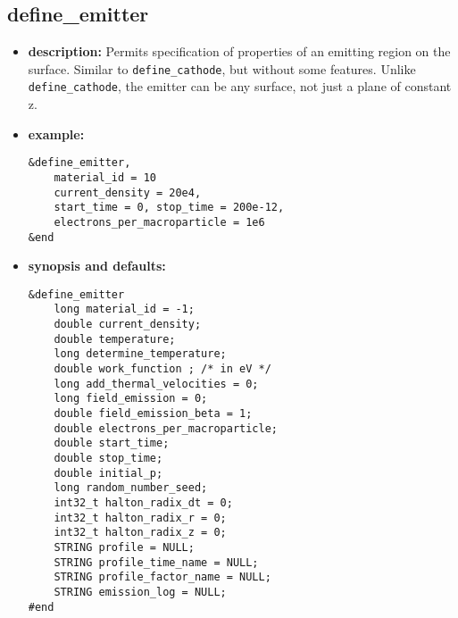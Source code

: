 %
\newpage

\subsection{define\_emitter}

\begin{itemize}

\item {\bf description:}
Permits specification of properties of an emitting region on the surface.
Similar to \verb|define_cathode|, but without some features.
Unlike \verb|define_cathode|, the emitter can be any surface, not just a plane of
constant z.

\item {\bf example:} 
\begin{verbatim}
&define_emitter,
    material_id = 10
    current_density = 20e4, 
    start_time = 0, stop_time = 200e-12,
    electrons_per_macroparticle = 1e6
&end
\end{verbatim}

\item {\bf synopsis and defaults:} 
\begin{verbatim}
&define_emitter
    long material_id = -1;
    double current_density;
    double temperature;
    long determine_temperature;
    double work_function ; /* in eV */
    long add_thermal_velocities = 0;
    long field_emission = 0;
    double field_emission_beta = 1;
    double electrons_per_macroparticle;
    double start_time;
    double stop_time;
    double initial_p;
    long random_number_seed;
    int32_t halton_radix_dt = 0;
    int32_t halton_radix_r = 0;
    int32_t halton_radix_z = 0;
    STRING profile = NULL;
    STRING profile_time_name = NULL;
    STRING profile_factor_name = NULL;
    STRING emission_log = NULL;
#end

\end{verbatim}


\end{itemize}
